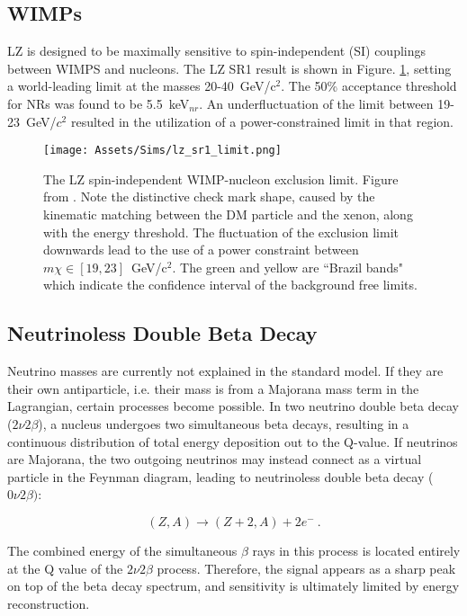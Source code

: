 \subsection{WIMPs}

LZ is designed to be maximally sensitive to spin-independent (SI) couplings between WIMPS and nucleons.
The LZ SR1 result is shown in Figure. \ref{fig:sr1_limit}, setting a world-leading limit at the masses 20-40~GeV/c$^2$.
The 50\% acceptance threshold for NRs was found to be 5.5~keV$_{nr}$.
An underfluctuation of the limit between 19-23~GeV/$c^2$ resulted in the utilization of a power-constrained limit in that region\cite{cowan_power-constrained_2011}.

\begin{figure}
    \centering
    \texttt{[image: Assets/Sims/lz\_sr1\_limit.png]}
    \caption[The LZ spin-independent WIMP-nucleon exclusion limit.]%
    {The LZ spin-independent WIMP-nucleon exclusion limit. Figure from \cite{aalbers_first_2022}.
    Note the distinctive check mark shape, caused by the kinematic matching between the DM particle and the xenon, along with the energy threshold.
    The fluctuation of the exclusion limit downwards lead to the use of a power constraint between $m\chi \in [19,23]$~GeV/c$^2$.
    The green and yellow are ``Brazil bands" which indicate the confidence interval of the background free limits.}
    \label{fig:sr1_limit}
\end{figure}
\subsection{Neutrinoless Double Beta Decay}

Neutrino masses are currently not explained in the standard model. 
If they are their own antiparticle, i.e. their mass is from a Majorana mass term in the Lagrangian, certain processes become possible.
In two neutrino double beta decay ($2\nu 2 \beta$), a nucleus undergoes two simultaneous beta decays, resulting in a continuous distribution of total energy deposition out to the Q-value.
If neutrinos are Majorana, the two outgoing neutrinos may instead connect as a virtual particle in the Feynman diagram, leading to neutrinoless double beta decay ($0\nu 2 \beta)$:

\begin{equation}
    (Z,A) \rightarrow (Z+2, A) + 2 e^-~.
    \label{eq:dbd}
\end{equation}

The combined energy of the simultaneous $\beta$ rays in this process is located entirely at the Q value of the $2 \nu 2 \beta$ process.
Therefore, the signal appears as a sharp peak on top of the beta decay spectrum, and sensitivity is ultimately limited by energy reconstruction.


